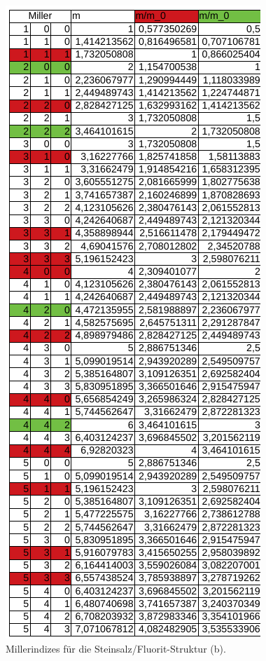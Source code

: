 \begin{figure}
  \centering
  \includegraphics{ressources/Steinsalz.png}
  \caption{Millerindizes für die Steinsalz/Fluorit-Struktur (b).}
  \label{fig:Anhang2}
\end{figure}

